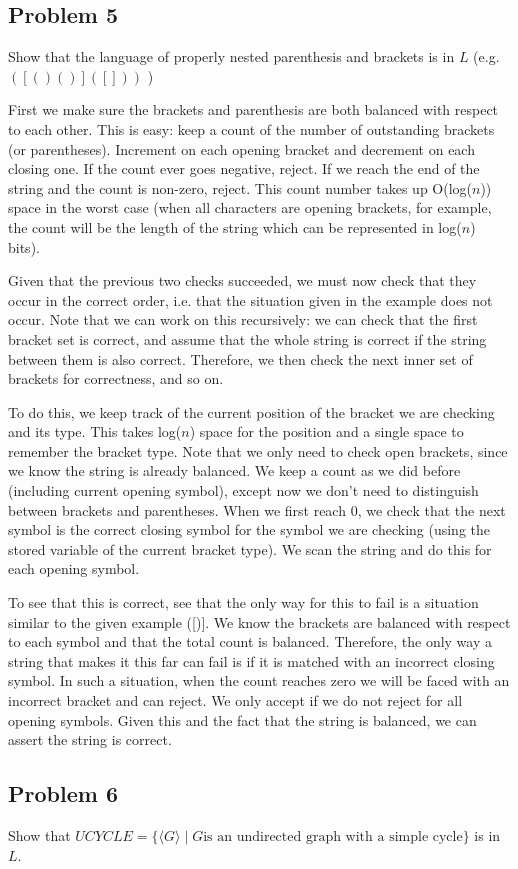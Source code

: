 \documentclass[english]{article}
\begin{document}
\subsection*{Problem 5}
Show that the language of properly nested parenthesis and brackets is in $L$ (e.g. $([()()]([]))$ )

First we make sure the brackets and parenthesis are both balanced with respect to each other.
This is easy: keep a count of the number of outstanding brackets (or parentheses). Increment on each
opening bracket and decrement on each closing one. If the count ever goes negative, reject. If we
reach the end of the string and the count is non-zero, reject. This count number takes up O(log($n$))
space in the worst case (when all characters are opening brackets, for example, the count will be
the length of the string which can be represented in log($n$) bits).

Given that the previous two checks succeeded, we must now check that they occur in the correct order,
i.e. that the situation given in the example does not occur. Note that we can work on this recursively:
we can check that the first bracket set is correct, and assume that the whole string is correct if the
string between them is also correct. Therefore, we then check the next inner set of brackets for
correctness, and so on.

To do this, we keep track of the current position of the bracket we are checking and its type.
This takes log($n$) space for the position and a single space to remember the bracket type.
Note that we only need to check open brackets, since we know the string is already balanced.
We keep a count as we did before (including current opening symbol), except now we don't need to
distinguish between brackets and parentheses. When we first reach 0, we check that the next symbol
is the correct closing symbol for the symbol we are checking (using the stored variable of the
current bracket type). We scan the string and do this for each opening symbol.

To see that this is correct, see that the only way for this to fail is a situation similar to the
given example ([)]. We know the brackets are balanced with respect to each symbol and that the total
count is balanced. Therefore, the only way a string that makes it this far can fail is if it is
matched with an incorrect closing symbol. In such a situation, when the count reaches zero we will
be faced with an incorrect bracket and can reject. We only accept if we do not reject for all
opening symbols. Given this and the fact that the string is balanced, we can assert the string is
correct.

\subsection*{Problem 6}
Show that $UCYCLE = \{ \langle G \rangle \mid G \textrm{is an undirected graph with a simple cycle} \}$
is in $L$.
\end{document}
